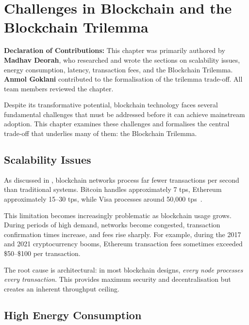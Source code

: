 \chapter{Challenges in Blockchain and the Blockchain Trilemma}
\label{ch:challenges}

\noindent\textbf{Declaration of Contributions:} This chapter was primarily authored by \textbf{Madhav Deorah}, who researched and wrote the sections on scalability issues, energy consumption, latency, transaction fees, and the Blockchain Trilemma. \textbf{Anmol Goklani} contributed to the formalisation of the trilemma trade-off. All team members reviewed the chapter.

\bigskip

Despite its transformative potential, blockchain technology faces several fundamental challenges that must be addressed before it can achieve mainstream adoption. This chapter examines these challenges and formalises the central trade-off that underlies many of them: the Blockchain Trilemma.

\section{Scalability Issues}
\label{sec:scalability-challenge}

As discussed in , blockchain networks process far fewer transactions per second than traditional systems. Bitcoin handles approximately 7 \gls{tps}, Ethereum approximately 15--30 \gls{tps}, while Visa processes around 50{,}000 \gls{tps}~\cite{kohad2020scalability}.

This limitation becomes increasingly problematic as blockchain usage grows. During periods of high demand, networks become congested, transaction confirmation times increase, and fees rise sharply. For example, during the 2017 and 2021 cryptocurrency booms, Ethereum transaction fees sometimes exceeded \$50--\$100 per transaction.

The root cause is architectural: in most blockchain designs, \emph{every node processes every transaction}. This provides maximum security and decentralisation but creates an inherent throughput ceiling.

\section{High Energy Consumption}
\label{sec:energy}

